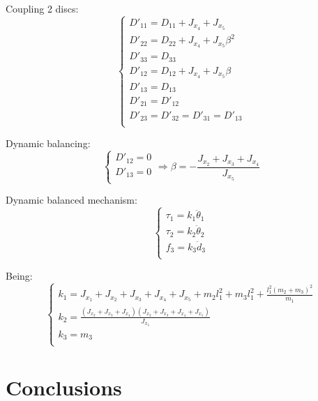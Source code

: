 \documentclass[a4paper,11pt,brazil,fleqn]{article}
\begin{document}
Coupling 2 discs:
\begin{equation}
\begin{cases}
D'_{11} = D_{11} + J_{x_4} + J_{x_5} \\
D'_{22} = D_{22} + J_{x_4} + J_{x_5} \beta^2 \\
D'_{33} = D_{33} \\
D'_{12} = D_{12} + J_{x_4} + J_{x_5} \beta \\
D'_{13} = D_{13} \\
D'_{21} = D'_{12} \\
D'_{23} = D'_{32} = D'_{31} = D'_{13}\\
\end{cases}
\end{equation}

Dynamic balancing:
\begin{equation}
\begin{cases}
D'_{12} = 0 \\
D'_{13} = 0 \\
\end{cases}
\Rightarrow \beta = -\frac{J_{x_2}+J_{x_3}+J_{x_4}}{J_{x_5}}
\end{equation}

Dynamic balanced mechanism:
\begin{equation}
\begin{cases}
\tau_1 = k_1 \ddot{\theta}_1 \\
\tau_2 = k_2 \ddot{\theta}_2 \\
f_3 = k_3 \ddot{d}_3 \\
\end{cases}
\end{equation}

Being:
\begin{equation}
\begin{cases}
k_1 = J_{x_1} + J_{x_2} + J_{x_3} + J_{x_4} + J_{x_5} + m_2 l_1^2 + m_3 l_1^2 + \frac{l_1^2 (m_2 + m_3)^2}{m_1} \\
k_2 = \frac{(J_{x_2}+J_{x_3}+J_{x_4})(J_{x_2}+J_{x_3}+J_{x_4}+J_{x_5})}{J_{x_5}} \\
k_3 = m_3 \\
\end{cases}
\end{equation}



\section{Conclusions}\label{S04}






{} 



\end{document}
